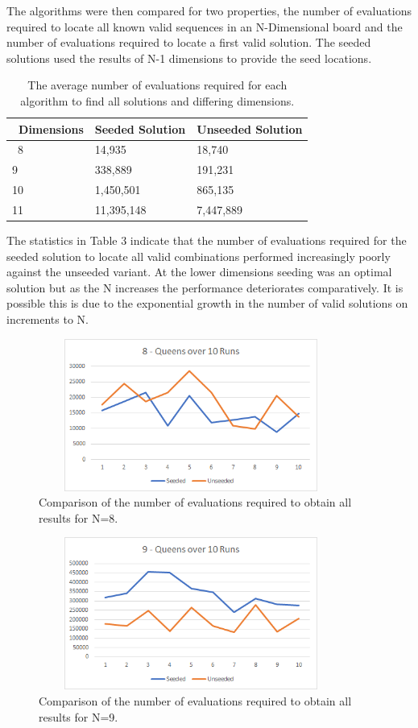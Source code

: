 \documentclass[a4paper,onecolumn,11pt]{article}
\begin{document}
The algorithms were then compared for two properties, the number of evaluations required to locate all known valid sequences in an N-Dimensional board and the number of evaluations required to locate a first valid solution. The seeded solutions used the results of N-1 dimensions to provide the seed locations.

\begin{table}[ht]
	\begin{tabular}{|p{2cm}|p{6cm}|p{6cm}|} 
		\hline\
		Dimensions & Seeded Solution & Unseeded Solution \\
		\hline\
		8 & 14,935 & 18,740 \\
		9 & 338,889 & 191,231 \\
		10 & 1,450,501 & 865,135 \\
		11 & 11,395,148 & 7,447,889 \\
		\hline
	\end{tabular}
\caption{The average number of evaluations required for each algorithm to find all solutions and differing dimensions.}
\end{table}

The statistics in Table 3 indicate that the number of evaluations required for the seeded solution to locate all valid combinations performed increasingly poorly against the unseeded variant. At the lower dimensions seeding was an optimal solution but as the N increases the performance deteriorates comparatively. It is possible this is due to the exponential growth in the number of valid solutions on increments to N. 

\begin{figure}[!htbp]
	\centering	
	\includegraphics[width=10cm, height=5cm]{8QueensAllValues}
	\caption{Comparison of the number of evaluations required to obtain all results for N=8.}
\end{figure}

\begin{figure}[!htbp]
	\centering	
	\includegraphics[width=10cm, height=5cm]{9QueensAllValues}
		\caption{Comparison of the number of evaluations required to obtain all results for N=9.}
\end{figure}
\end{document}
